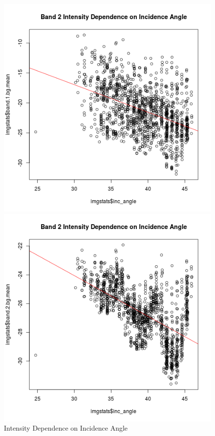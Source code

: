 \documentclass[fleqn,10pt]{SelfArx} %
\begin{document}
\begin{figure}\centering
	\begin{minipage}{0.45\linewidth}
		\includegraphics[width=.9\linewidth]{iceberg/analysis/b1_bg_intensity-ing_angle_prenorm.png}
	\end{minipage}%
	\begin{minipage}{0.45\linewidth}
		\includegraphics[width=.9\linewidth]{iceberg/analysis/b2_bg_intensity-ing_angle_prenorm.png}
	\end{minipage}
	\caption{Intensity Dependence on Incidence Angle}\label{inc_angle1}
\end{figure}
\end{document}
